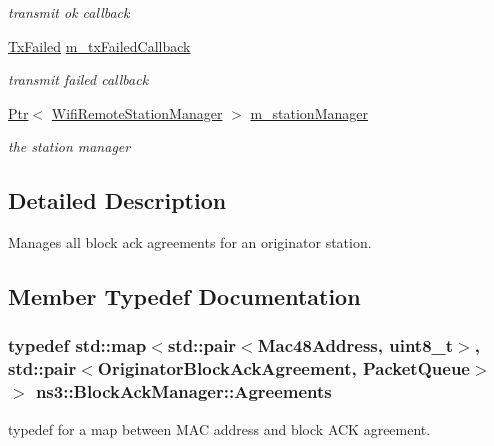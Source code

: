 \begin{DoxyCompactItemize}
\begin{DoxyCompactList}\small\item\em transmit ok callback \end{DoxyCompactList}\item 
\hyperlink{classns3_1_1BlockAckManager_a19b8dc1978e36f011ad60a91c1c7d09c}{Tx\+Failed} \hyperlink{classns3_1_1BlockAckManager_a58ccfd5da1b7e739b732699ddcc13530}{m\+\_\+tx\+Failed\+Callback}
\begin{DoxyCompactList}\small\item\em transmit failed callback \end{DoxyCompactList}\item 
\hyperlink{classns3_1_1Ptr}{Ptr}$<$ \hyperlink{classns3_1_1WifiRemoteStationManager}{Wifi\+Remote\+Station\+Manager} $>$ \hyperlink{classns3_1_1BlockAckManager_afb809abb11edae6179dc2f5b8c1f8ce5}{m\+\_\+station\+Manager}
\begin{DoxyCompactList}\small\item\em the station manager \end{DoxyCompactList}\end{DoxyCompactItemize}


\subsection{Detailed Description}
Manages all block ack agreements for an originator station. 

\subsection{Member Typedef Documentation}
\subsubsection[{\texorpdfstring{Agreements}{Agreements}}]{\setlength{\rightskip}{0pt plus 5cm}typedef std\+::map$<$std\+::pair$<${\bf Mac48\+Address}, uint8\+\_\+t$>$, std\+::pair$<${\bf Originator\+Block\+Ack\+Agreement}, {\bf Packet\+Queue}$>$ $>$ {\bf ns3\+::\+Block\+Ack\+Manager\+::\+Agreements}\hspace{0.3cm}{\ttfamily [private]}}\hypertarget{classns3_1_1BlockAckManager_aada7ad4c4011ce66e28aaa2bcb7aa915}{}\label{classns3_1_1BlockAckManager_aada7ad4c4011ce66e28aaa2bcb7aa915}
typedef for a map between M\+AC address and block A\+CK agreement. 
